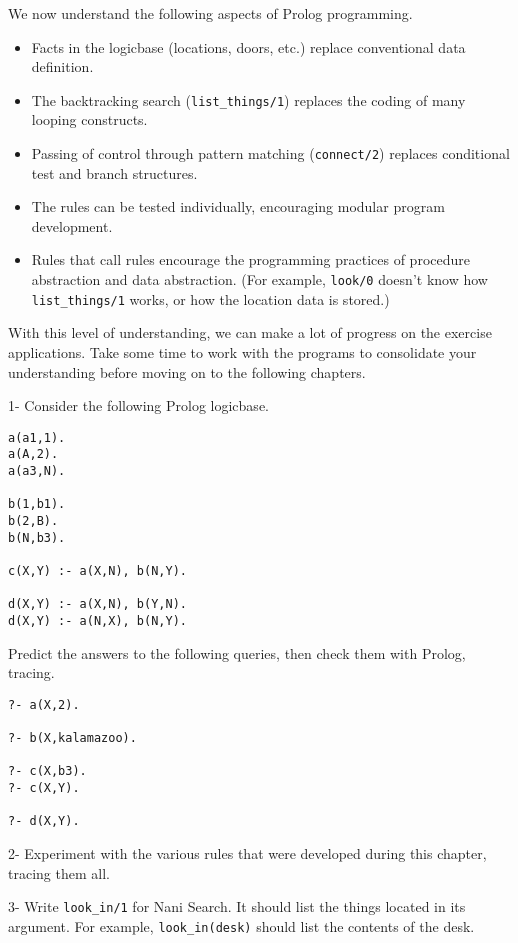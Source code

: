 We now understand the following aspects of Prolog programming.
\begin{itemize}
  \item 
Facts in the logicbase (locations, doors, etc.) replace conventional data definition.
  \item 
The backtracking search (\verb'list_things/1') replaces the coding of many
looping constructs.
  \item 
Passing of control through pattern matching (\verb'connect/2') replaces
conditional test and branch structures.
  \item 
The rules can be tested individually, encouraging modular program development.
  \item 
Rules that call rules encourage the programming practices of procedure
abstraction and data abstraction. (For example, \verb'look/0' doesn't know how
\verb'list_things/1' works, or how the location data is stored.)
\end{itemize}
 
With this level of understanding, we can make a lot of progress on the exercise
applications. Take some time to work with the programs to consolidate your
understanding before moving on to the following chapters.

\secdown


1- Consider the following Prolog logicbase.

\begin{verbatim}
a(a1,1).
a(A,2).
a(a3,N).        

b(1,b1).
b(2,B).
b(N,b3).

c(X,Y) :- a(X,N), b(N,Y).

d(X,Y) :- a(X,N), b(Y,N).
d(X,Y) :- a(N,X), b(N,Y).
\end{verbatim}
Predict the answers to the following queries, then check them with Prolog,
tracing.

\begin{verbatim}
?- a(X,2).

?- b(X,kalamazoo).

?- c(X,b3).
?- c(X,Y).

?- d(X,Y).
\end{verbatim}


2- Experiment with the various rules that were developed during this chapter,
tracing them all.

3- Write \verb'look_in/1' for Nani Search. It should list the things located in
its argument. For example, \verb'look_in(desk)' should list the contents of the
desk.

